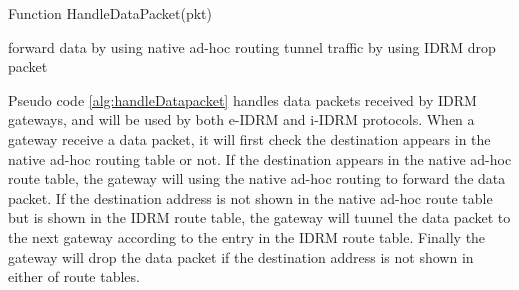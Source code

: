 \begin{algorithm}[htb!]
\caption{Function HandleDataPacket(pkt)}
\label{alg:handleDatapacket}
{\small
\begin{algorithmic}[1]
		\STATE forward data by using native ad-hoc routing
		\STATE tunnel traffic by using IDRM
	\ELSE 
		\STATE drop packet
	\ENDIF	
\end{algorithmic} 
}
\end{algorithm}  

Pseudo code \ref{alg:handleDatapacket} handles data packets
received by IDRM gateways, 
and will be used by both e-IDRM and i-IDRM protocols. 
When a gateway receive a data packet, 
it will first check the destination
appears in the native ad-hoc routing table or not. 
If the destination appears in the native ad-hoc route table,
the gateway will using the native ad-hoc routing to forward the data packet.
If the destination address is not shown in the native ad-hoc route table
but is shown in the IDRM route table,
the gateway will tuunel the data packet to the next gateway according to the
entry in the IDRM route table.
Finally the gateway will drop the data packet if the destination address is not
shown in either of route tables.